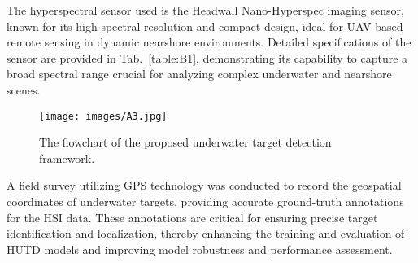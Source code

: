 \par
The hyperspectral sensor used is the Headwall Nano-Hyperspec imaging sensor, known for its high spectral resolution and compact design, ideal for UAV-based remote sensing in dynamic nearshore environments.  
Detailed specifications of the sensor are provided in Tab.~\ref{table:B1}, demonstrating its capability to capture a broad spectral range crucial for analyzing complex underwater and nearshore scenes.   
\par
\begin{figure*}[!t]             
    \centering               
    \texttt{[image: images/A3.jpg]}                
    \caption{The flowchart of the proposed underwater target detection framework.}             
    \label{fig:C1}   
\end{figure*}
A field survey utilizing GPS technology was conducted to record the geospatial coordinates of underwater targets, providing accurate ground-truth annotations for the HSI data.  
These annotations are critical for ensuring precise target identification and localization, thereby enhancing the training and evaluation of HUTD models and improving model robustness and performance assessment.
